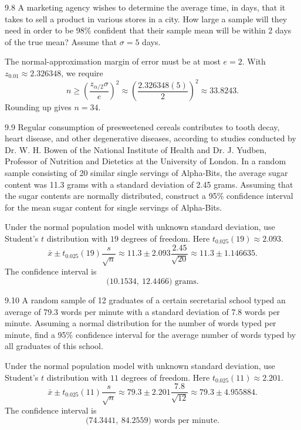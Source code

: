 \documentclass[11pt,oneside]{article}
\begin{document}
\begin{exercise}{9.8}
A marketing agency wishes to determine the average time, in days, that it takes to sell a product in various stores in a city. How large a sample will they need in order to be 98\% confident that their sample mean will be within 2 days of the true mean? Assume that $\sigma=5$ days.
\end{exercise}
\begin{solution}
The normal-approximation margin of error must be at most $e=2$. With $z_{0.01}\approx 2.326348$, we require
\[
n\ge \left(\frac{z_{\alpha/2}\sigma}{e}\right)^2\approx \left(\frac{2.326348(5)}{2}\right)^2\approx 33.8243.
\]
Rounding up gives $\boxed{n=34}$.
\end{solution}

\begin{exercise}{9.9}
Regular consumption of presweetened cereals contributes to tooth decay, heart disease, and other degenerative diseases, according to studies conducted by Dr. W. H. Bowen of the National Institute of Health and Dr. J. Yudben, Professor of Nutrition and Dietetics at the University of London. In a random sample consisting of 20 similar single servings of Alpha-Bits, the average sugar content was 11.3 grams with a standard deviation of 2.45 grams. Assuming that the sugar contents are normally distributed, construct a 95\% confidence interval for the mean sugar content for single servings of Alpha-Bits.
\end{exercise}
\begin{solution}
Under the normal population model with unknown standard deviation, use Student's $t$ distribution with $19$ degrees of freedom. Here $t_{0.025}(19)\approx 2.093$.
\[
\bar x\pm t_{0.025}(19)\frac{s}{\sqrt n}\approx 11.3\pm 2.093\frac{2.45}{\sqrt{20}}\approx 11.3\pm 1.146635.
\]
The confidence interval is 
\[
\boxed{\bigl(10.1534,\ 12.4466\bigr)}\text{ grams}.
\]
\end{solution}

\begin{exercise}{9.10}
A random sample of 12 graduates of a certain secretarial school typed an average of 79.3 words per minute with a standard deviation of 7.8 words per minute. Assuming a normal distribution for the number of words typed per minute, find a 95\% confidence interval for the average number of words typed by all graduates of this school.
\end{exercise}
\begin{solution}
Under the normal population model with unknown standard deviation, use Student's $t$ distribution with $11$ degrees of freedom. Here $t_{0.025}(11)\approx 2.201$.
\[
\bar x\pm t_{0.025}(11)\frac{s}{\sqrt n}\approx 79.3\pm 2.201\frac{7.8}{\sqrt{12}}\approx 79.3\pm 4.955884.
\]
The confidence interval is 
\[
\boxed{\bigl(74.3441,\ 84.2559\bigr)}\text{ words per minute}.
\]
\end{solution}
\end{document}
